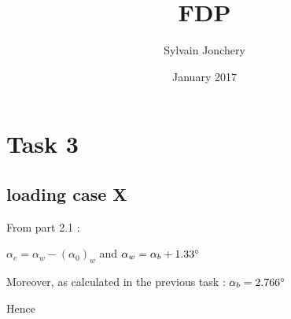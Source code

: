 \documentclass{article}
\title{FDP}
\author{Sylvain Jonchery }
\date{January 2017}
\begin{document}
\maketitle

\section{Task 3}

\subsection{loading case X}

From \cite{dataPack} part 2.1 : 

$\alpha_e=\alpha_w -(\alpha_0)_w$ and $\alpha_w=\alpha_b+1.33\degree$

Moreover, as calculated in the previous task : $\alpha_b=2.  766\degree$

Hence 


{}

\end{document}
